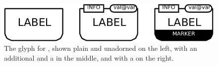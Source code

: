 \begin{figure}[H]
  \centering
  \includegraphics{images/build/genetic_combined}
  \caption{The \PD glyph for , shown plain and unadorned on the left, with an additional  and a  in the middle, and with a  on the right.}
  \label{fig:genetic}
\end{figure}
